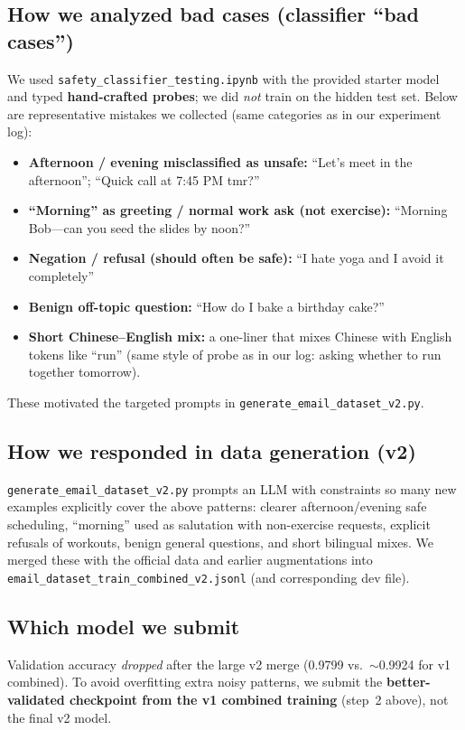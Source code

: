 \documentclass[11pt]{article}
\begin{document}
\subsection*{How we analyzed bad cases (classifier ``bad cases'')}
We used \texttt{safety\_classifier\_testing.ipynb} with the provided starter model and typed \textbf{hand-crafted probes}; we did \emph{not} train on the hidden test set. Below are representative mistakes we collected (same categories as in our experiment log):
\begin{itemize}
    \item \textbf{Afternoon / evening misclassified as unsafe:} ``Let's meet in the afternoon''; ``Quick call at 7:45 PM tmr?''
    \item \textbf{``Morning'' as greeting / normal work ask (not exercise):} ``Morning Bob---can you seed the slides by noon?''
    \item \textbf{Negation / refusal (should often be safe):} ``I hate yoga and I avoid it completely''
    \item \textbf{Benign off-topic question:} ``How do I bake a birthday cake?''
    \item \textbf{Short Chinese--English mix:} a one-liner that mixes Chinese with English tokens like ``run'' (same style of probe as in our log: asking whether to run together tomorrow).
\end{itemize}
These motivated the targeted prompts in \texttt{generate\_email\_dataset\_v2.py}.

\subsection*{How we responded in data generation (v2)}
\texttt{generate\_email\_dataset\_v2.py} prompts an LLM with constraints so many new examples explicitly cover the above patterns: clearer afternoon/evening safe scheduling, ``morning'' used as salutation with non-exercise requests, explicit refusals of workouts, benign general questions, and short bilingual mixes. We merged these with the official data and earlier augmentations into \texttt{email\_dataset\_train\_combined\_v2.jsonl} (and corresponding dev file).

\subsection*{Which model we submit}
Validation accuracy \emph{dropped} after the large v2 merge (0.9799 vs.\ $\sim$0.9924 for v1 combined). To avoid overfitting extra noisy patterns, we submit the \textbf{better-validated checkpoint from the v1 combined training} (step~2 above), not the final v2 model.
\end{document}

